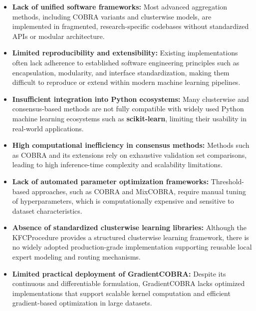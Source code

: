 \begin{itemize}    
    \item \textbf{Lack of unified software frameworks:} Most advanced aggregation methods, including COBRA variants and clusterwise models, are implemented in fragmented, research-specific codebases without standardized APIs or modular architecture.
          
          
    \item \textbf{Limited reproducibility and extensibility:} Existing implementations often lack adherence to established software engineering principles such as encapsulation, modularity, and interface standardization, making them difficult to reproduce or extend within modern machine learning pipelines.
          
    \item \textbf{Insufficient integration into Python ecosystems:} Many clusterwise and consensus-based methods are not fully compatible with widely used Python machine learning ecosystems such as \textbf{scikit-learn}, limiting their usability in real-world applications.
          
    \item \textbf{High computational inefficiency in consensus methods:} Methods such as COBRA and its extensions rely on exhaustive validation set comparisons, leading to high inference-time complexity and scalability limitations.
          
    \item \textbf{Lack of automated parameter optimization frameworks:} Threshold-based approaches, such as COBRA and MixCOBRA, require manual tuning of hyperparameters, which is computationally expensive and sensitive to dataset characteristics.
          
    \item \textbf{Absence of standardized clusterwise learning libraries:} Although the KFCProcedure provides a structured clusterwise learning framework, there is no widely adopted production-grade implementation supporting reusable local expert modeling and routing mechanisms.
          
    \item \textbf{Limited practical deployment of GradientCOBRA:} Despite its continuous and differentiable formulation, GradientCOBRA lacks optimized implementations that support scalable kernel computation and efficient gradient-based optimization in large datasets.
          
          
\end{itemize}

